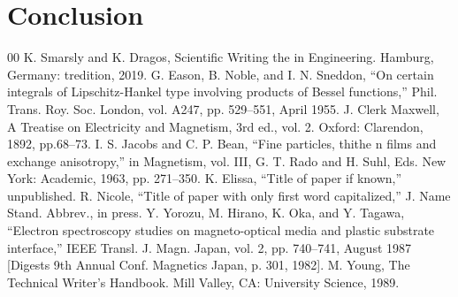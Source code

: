 \documentclass[conference]{IEEEtran}
\begin{document}
\section{Conclusion}


\begin{thebibliography}{00}
 K. Smarsly and K. Dragos, Scientific Writing the in Engineering. Hamburg, Germany: tredition, 2019.
 G. Eason, B. Noble, and I. N. Sneddon, ``On certain integrals of Lipschitz-Hankel type involving products of Bessel functions,'' Phil. Trans. Roy. Soc. London, vol. A247, pp. 529--551, April 1955.
 J. Clerk Maxwell, A Treatise on Electricity and Magnetism, 3rd ed., vol. 2. Oxford: Clarendon, 1892, pp.68--73.
 I. S. Jacobs and C. P. Bean, ``Fine particles, thithe n films and exchange anisotropy,'' in Magnetism, vol. III, G. T. Rado and H. Suhl, Eds. New York: Academic, 1963, pp. 271--350.
 K. Elissa, ``Title of paper if known,'' unpublished.
 R. Nicole, ``Title of paper with only first word capitalized,'' J. Name Stand. Abbrev., in press.
 Y. Yorozu, M. Hirano, K. Oka, and Y. Tagawa, ``Electron spectroscopy studies on magneto-optical media and plastic substrate interface,'' IEEE Transl. J. Magn. Japan, vol. 2, pp. 740--741, August 1987 [Digests 9th Annual Conf. Magnetics Japan, p. 301, 1982].
 M. Young, The Technical Writer's Handbook. Mill Valley, CA: University Science, 1989.
\end{thebibliography}
\vspace{12pt}
\end{document}
